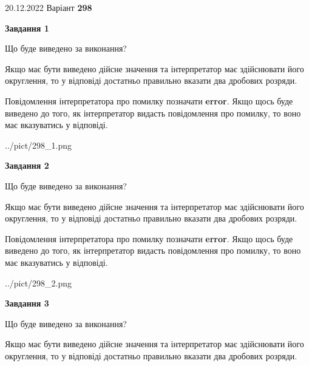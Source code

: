 \documentclass[12pt, ukrainian]{article}
\begin{document}
{20.12.2022 Варіант \No \textbf { 298 }\par}
{
\begin {Large}

{\begin {center}\textbf{Завдання 1}\end {center}}\par
Що буде виведено за виконання? \par

Якщо має бути виведено дійсне значення та інтерпретатор має здійснювати його округлення, 
то у відповіді достатньо правильно вказати два дробових розряди.

Повідомлення інтерпретатора про помилку позначати \textbf{error}.
Якщо щось буде виведено до того, як інтерпретатор видасть повідомлення про помилку, 
то воно має вказуватись у відповіді. \par

\begin{center}
	{../pict/298_1.png}
\end{center}
\newpage

{\begin {center}\textbf{Завдання 2}\end {center}}\par
Що буде виведено за виконання? \par

Якщо має бути виведено дійсне значення та інтерпретатор має здійснювати його округлення, 
то у відповіді достатньо правильно вказати два дробових розряди.

Повідомлення інтерпретатора про помилку позначати \textbf{error}.
Якщо щось буде виведено до того, як інтерпретатор видасть повідомлення про помилку, 
то воно має вказуватись у відповіді. \par

\begin{center}
	{../pict/298_2.png}
\end{center}
\newpage

{\begin {center}\textbf{Завдання 3}\end {center}}\par
Що буде виведено за виконання? \par

Якщо має бути виведено дійсне значення та інтерпретатор має здійснювати його округлення, 
то у відповіді достатньо правильно вказати два дробових розряди.


\end{Large}}
\end{document}
